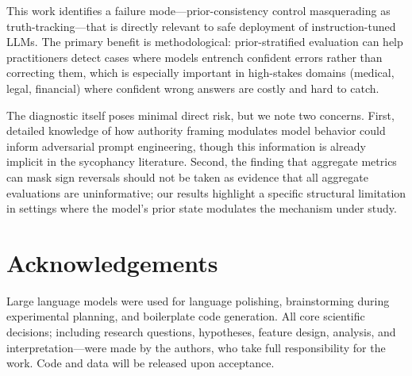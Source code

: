 \documentclass[11pt]{article}
\begin{document}
This work identifies a failure mode---prior-consistency control masquerading as truth-tracking---that is directly relevant to safe deployment of instruction-tuned LLMs.
The primary benefit is methodological: prior-stratified evaluation can help practitioners detect cases where models entrench confident errors rather than correcting them, which is especially important in high-stakes domains (medical, legal, financial) where confident wrong answers are costly and hard to catch.

The diagnostic itself poses minimal direct risk, but we note two concerns.
First, detailed knowledge of how authority framing modulates model behavior could inform adversarial prompt engineering, though this information is already implicit in the sycophancy literature.
Second, the finding that aggregate metrics can mask sign reversals should not be taken as evidence that all aggregate evaluations are uninformative; our results highlight a specific structural limitation in settings where the model's prior state modulates the mechanism under study.

\section*{Acknowledgements}

Large language models were used for language polishing, brainstorming during experimental planning, and boilerplate code generation.
All core scientific decisions; including research questions, hypotheses, feature design, analysis, and interpretation---were made by the authors, who take full responsibility for the work.
Code and data will be released upon acceptance.



\appendix
\end{document}

